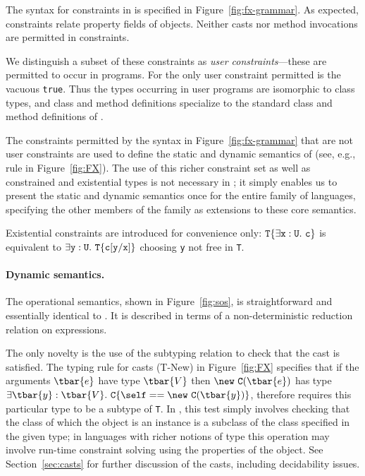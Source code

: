 The syntax for constraints in \FXZ{} is specified in
Figure~\ref{fig:fx-grammar}. As expected, constraints
relate property fields of objects. Neither casts
nor method invocations are permitted in constraints.

We distinguish a subset of these constraints as
{\em user constraints}---these are permitted to occur in
programs. For \FXZ{} the only user constraint permitted is the vacuous
{\tt true}. Thus the types occurring in user programs are isomorphic
to class types, and class and method definitions specialize to the
standard class and method definitions of \FJ{}. 

The constraints permitted by the syntax in
Figure~\ref{fig:fx-grammar} that
are not user constraints are used to define the static and
dynamic semantics of \FXZ{} (see, e.g., rule \TField{} in Figure~\ref{fig:FX}).
The use of this richer constraint set as well as constrained and existential types is
not necessary in \FXZ; it simply enables us to present the static and dynamic
semantics once for the entire family of \FX{} languages,
specifying the other members of the family as extensions
to these core semantics.

Existential constraints are introduced for convenience only:
${\tt T}\{\exists {\tt x}:{\tt U}.~{\tt c}\}$ is equivalent to $\exists {\tt y}:{\tt U}.~{\tt T}\{{\tt c}[{\tt y}/{\tt x}]\}$ choosing {\tt y} not free in {\tt T}.

\paragraph{Dynamic semantics.}
The operational semantics, shown in Figure~\ref{fig:sos},
is straightforward and essentially identical
to \FJ \cite{FJ}. It is described in terms of a non-deterministic
reduction relation on expressions.

The only novelty is the use of the
subtyping relation to check that the cast is satisfied.
The typing rule for casts ({\sc T-New}) in Figure~\ref{fig:FX} specifies that if the arguments $\tbar{e}$ have type $\tbar{V}$ then $\new~{\tt C}(\tbar{e})$ has type $\exists\tbar{y}:\tbar{V}.~{\tt C}\{\self==\new~{\tt C}(\tbar{y})\}$, therefore {\RCast} requires this particular type to be a subtype of {\tt T}.
In \FXZ, this
test simply involves checking that the class of which the object is an
instance is a subclass of the class specified in the given type; in
languages with richer notions of type this operation may
involve run-time constraint solving using the properties of the object.
See Section~\ref{sec:casts} for further discussion of the casts,
including decidability issues.

